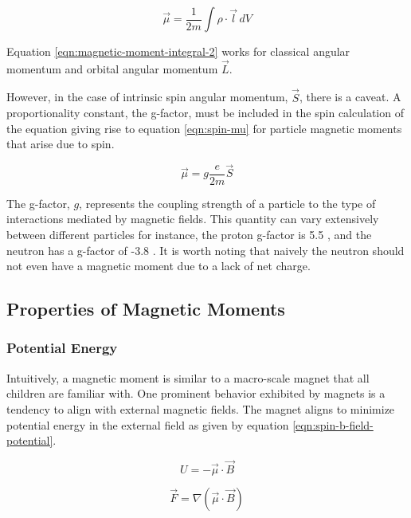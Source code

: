 \begin{equation}
\label{eqn:magnetic-moment-integral-2}
\vec{\mu} = \frac{1}{2 m} \int \rho \cdot \vec{l} \,dV
\end{equation}

\noindent 
Equation \ref{eqn:magnetic-moment-integral-2} works for classical angular momentum and orbital angular momentum $\vec{L}$.

However, in the case of intrinsic spin angular momentum, $\vec{S}$, there is a caveat.  A proportionality constant, the g-factor, must be included in the spin calculation of the equation giving rise to equation \ref{eqn:spin-mu} for particle magnetic moments that arise due to spin.

\begin{equation}
\label{eqn:spin-mu}
\vec{\mu} = g \frac{e}{2 m}\vec{S}
\end{equation}

The g-factor, $g$, represents the coupling strength of a particle to the type of interactions mediated by magnetic fields.  This quantity can vary extensively between different particles for instance, the proton g-factor is 5.5 \cite{codata}, and the neutron has a g-factor of -3.8 \cite{codata}.  It is worth noting that naively the neutron should not even have a magnetic moment due to a lack of net charge.

\subsection{Properties of Magnetic Moments}

\subsubsection{Potential Energy}
Intuitively, a magnetic moment is similar to a macro-scale magnet that all children are familiar with.  One prominent behavior exhibited by magnets is a tendency to align with external magnetic fields.  The magnet aligns to minimize potential energy in the external field as given by equation \ref{eqn:spin-b-field-potential}.

\begin{equation}
\label{eqn:spin-b-field-potential}
U = -\vec{\mu} \cdot \vec{B}
\end{equation}

\begin{equation}
\label{eqn:spin-b-field-force}
\vec{F} = \nabla (\vec{\mu} \cdot \vec{B})
\end{equation}

